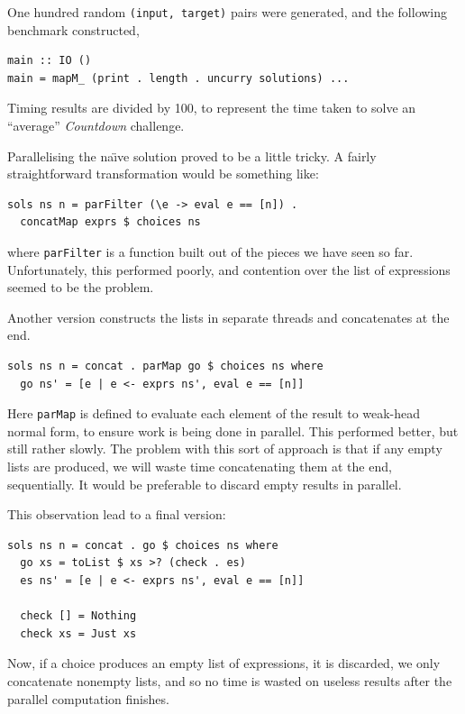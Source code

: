 One hundred random \verb|(input, target)| pairs were generated, and
the following benchmark constructed,

\begin{verbatim}
main :: IO ()
main = mapM_ (print . length . uncurry solutions) ...
\end{verbatim}

Timing results are divided by 100, to represent the time taken to
solve an ``average'' \textit{Countdown} challenge.

Parallelising the na\"{\i}ve solution proved to be a little tricky. A
fairly straightforward transformation would be something like:

\begin{verbatim}
sols ns n = parFilter (\e -> eval e == [n]) .
  concatMap exprs $ choices ns
\end{verbatim}

\noindent where \verb|parFilter| is a function built out of the pieces
we have seen so far. Unfortunately, this performed poorly, and
contention over the list of expressions seemed to be the
problem.

Another version constructs the lists in separate threads and
concatenates at the end.

\begin{verbatim}
sols ns n = concat . parMap go $ choices ns where
  go ns' = [e | e <- exprs ns', eval e == [n]]
\end{verbatim}

Here \verb|parMap| is defined to evaluate each element of the result
to weak-head normal form, to ensure work is being done in
parallel. This performed better, but still rather slowly. The problem
with this sort of approach is that if any empty lists are produced, we
will waste time concatenating them at the end, sequentially. It would
be preferable to discard empty results in parallel.

This observation lead to a final version:

\begin{verbatim}
sols ns n = concat . go $ choices ns where
  go xs = toList $ xs >? (check . es)
  es ns' = [e | e <- exprs ns', eval e == [n]]

  check [] = Nothing
  check xs = Just xs
\end{verbatim}

Now, if a choice produces an empty list of expressions, it is
discarded, we only concatenate nonempty lists, and so no time is
wasted on useless results after the parallel computation finishes.

